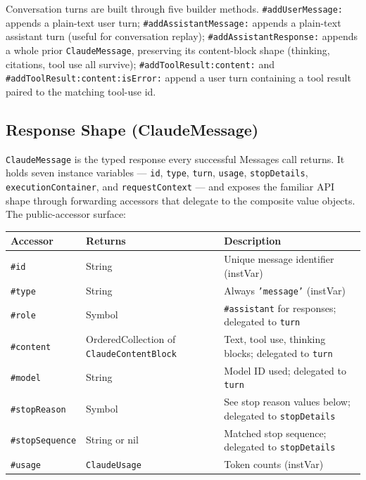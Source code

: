 \documentclass[a4paper,10pt,fleqn]{article}
\newcommand{\cls}[1]{\texttt{#1}}
\newcommand{\sel}[1]{\texttt{\##1}}
\begin{document}
\begin{sloppypar}
Conversation turns are built through five builder methods.
\sel{addUserMessage:} appends a plain-text user turn;
\sel{addAssistantMessage:} appends a plain-text assistant turn
(useful for conversation replay); \sel{addAssistantResponse:}
appends a whole prior \cls{ClaudeMessage}, preserving its
content-block shape (thinking, citations, tool use all survive);
\sel{addToolResult:content:} and
\sel{addToolResult:content:isError:} append a user turn
containing a tool result paired to the matching tool-use id.
\end{sloppypar}

\subsection{Response Shape (ClaudeMessage)}

\cls{ClaudeMessage} is the typed response every successful
Messages call returns.  It holds seven instance variables ---
\texttt{id}, \texttt{type}, \texttt{turn}, \texttt{usage},
\texttt{stopDetails}, \texttt{executionContainer}, and
\texttt{requestContext} --- and exposes the familiar API shape
through forwarding accessors that delegate to the composite
value objects.  The public-accessor surface:

\begin{center}
\small
\begin{tabular}{@{}llp{6cm}@{}}
\toprule
\textbf{Accessor} & \textbf{Returns} & \textbf{Description} \\
\midrule
\sel{id}           & String         & Unique message identifier (instVar) \\
\sel{type}         & String         & Always \texttt{'message'} (instVar) \\
\sel{role}         & Symbol         & \texttt{\#assistant} for responses; delegated to \texttt{turn} \\
\sel{content}      & OrderedCollection of \cls{ClaudeContentBlock}
                   & Text, tool use, thinking blocks; delegated to \texttt{turn} \\
\sel{model}        & String         & Model ID used; delegated to \texttt{turn} \\
\sel{stopReason}   & Symbol         & See stop reason values below; delegated to \texttt{stopDetails} \\
\sel{stopSequence} & String or nil  & Matched stop sequence; delegated to \texttt{stopDetails} \\
\sel{usage}        & \cls{ClaudeUsage} & Token counts (instVar) \\
\bottomrule
\end{tabular}
\end{center}
\end{document}
